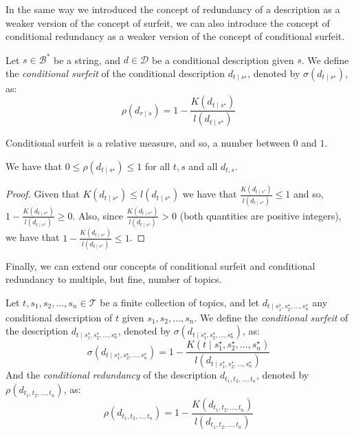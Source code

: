 In the same way we introduced the concept of redundancy of a description as a weaker version of the concept of surfeit, we can also introduce the concept of conditional redundancy as a weaker version of the concept of conditional surfeit.

\begin{definition}
Let $s \in \mathcal{B}^\ast$ be a string, and $d \in \mathcal{D}$ be a conditional description given $s$. We define the \emph{conditional surfeit} of the conditional description $d_{t \mid s^\star}$, denoted by $\sigma(d_{t \mid s^\star})$, as: 
\[
\rho(d_{r \mid s}) = 1 - \frac{K \left( d_{t \mid s^\star} \right)}{l \left( d_{t \mid s^\star} \right)}
\]
\end{definition}

Conditional surfeit is a relative measure, and so, a number between $0$ and $1$.

\begin{proposition}
We have that $0 \leq \rho(d_{t \mid s^\star}) \leq 1$ for all $t,s$ and all $d_{t,s}$.
\end{proposition}
\begin{proof}
Given that $K(d_{t \mid s^\star}) \leq l(d_{t \mid s^\star})$ we have that $\frac{K(d_{t \mid s^\star})}{l \left( d_{t \mid s^\star} \right)} \leq 1$ and so, $1 - \frac{K(d_{t \mid s^\star})}{l \left( d_{t \mid s^\star} \right)} \geq 0$. Also, since $\frac{K(d_{t \mid s^\star})}{l \left( d_{t \mid s^\star} \right)} > 0$ (both quantities are positive integers), we have that $1 - \frac{K(d_{t \mid s^\star})}{l \left( d_{t \mid s^\star} \right)} \leq 1$.
\end{proof}

Finally, we can extend our concepts of conditional surfeit and conditional redundancy to multiple, but fine, number of topics.

\begin{definition}
Let $t, s_1, s_2, \ldots, s_n \in \mathcal{T}$ be a finite collection of topics, and let $d_{t \mid s_1^\star, s_2^\star, \ldots,s_n^\star}$ any conditional description of $t$ given $s_1, s_2, \ldots, s_n$. We define the \emph{conditional surfeit} of the description $d_{t \mid s_1^\star, s_2^\star, \ldots,s_n^\star}$, denoted by $\sigma(d_{t \mid s_1^\star, s_2^\star, \ldots,s_n^\star})$, as: 
\[
\sigma(d_{t \mid s_1^\star, s_2^\star, \ldots,s_n^\star}) = 1 - \frac{K\left( t \mid s_1^\star, s_2^\star, \ldots,s_n^\star \right)}{l \left( d_{t \mid s_1^\star, s_2^\star, \ldots,s_n^\star} \right)}
\]
And the \emph{conditional redundancy} of the description $d_{t_1, t_2, \ldots, t_n}$, denoted by $\rho(d_{t_1, t_2, \ldots, t_n})$, as:
\[
\rho(d_{t_1, t_2, \ldots, t_n}) = 1 - \frac{K(d_{t_1, t_2, \ldots, t_n})}{l \left( d_{t_1, t_2, \ldots, t_n} \right)}
\]
\end{definition}

